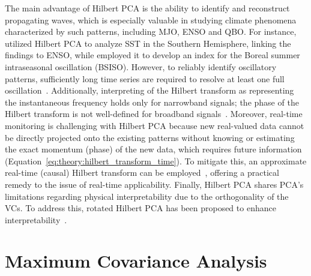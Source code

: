 The main advantage of Hilbert PCA is the ability to identify and reconstruct propagating waves, which is especially valuable in studying climate phenomena characterized by such patterns, including MJO, ENSO and QBO. For instance, \citet{cai_forcing_2001} utilized Hilbert PCA to analyze SST in the Southern Hemisphere, linking the findings to ENSO, while \citet{burger_intraseasonal_2021} employed it to develop an index for the Boreal summer intraseasonal oscillation (BSISO). However, to reliably identify oscillatory patterns, sufficiently long time series are required to resolve at least one full oscillation~\cite{merrifield_detecting_1990}. Additionally, interpreting of the Hilbert transform as representing the instantaneous frequency holds only for narrowband signals; the phase of the Hilbert transform is not well-defined for broadband signals~\cite{gabor_theory_1946,boashash_estimating_1992}. Moreover, real-time monitoring is challenging with Hilbert PCA because new real-valued data cannot be directly projected onto the existing patterns without knowing or estimating the exact momentum (phase) of the new data, which requires future information (Equation~\eqref{eq:theory:hilbert_transform_time}). To mitigate this, an approximate real-time (causal) Hilbert transform can be employed~\cite{burger_complex_1993,burger_intraseasonal_2021}, offering a practical remedy to the issue of real-time applicability. Finally, Hilbert PCA shares PCA's limitations regarding physical interpretability due to the orthogonality of the VCs. To address this, rotated Hilbert PCA has been proposed to enhance interpretability~\cite{horel_rotated_1981,bloomfield_orthogonal_1994}. 


\section{Maximum Covariance Analysis}
\label{sec:theory:mca}

